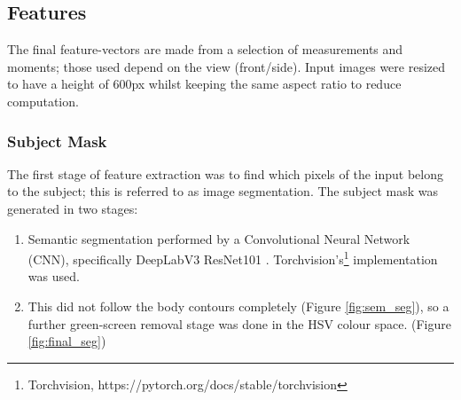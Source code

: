 \documentclass[conference]{IEEEtran}
\begin{document}
\subsection{Features}
\noindent The final feature-vectors are made from a selection of measurements and moments; those used depend on the view (front/side). Input images were resized to have a height of 600px whilst keeping the same aspect ratio to reduce computation.\\

\subsubsection{Subject Mask}
The first stage of feature extraction was to find which pixels of the input belong to the subject; this is referred to as image segmentation. The subject mask was generated in two stages: 
\begin{enumerate}
  \item Semantic segmentation performed by a Convolutional Neural Network (CNN), specifically DeepLabV3 ResNet101 \cite{DBLP:journals/corr/ChenPSA17}. Torchvision's\footnote{Torchvision, https://pytorch.org/docs/stable/torchvision} implementation was used.
  \item This did not follow the body contours completely (Figure \ref{fig:sem_seg}), so a further green-screen removal stage was done in the HSV colour space. (Figure \ref{fig:final_seg})
\end{enumerate}
\end{document}
